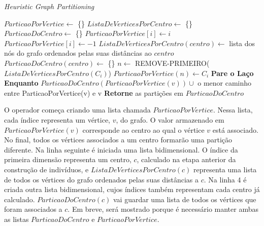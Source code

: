 \begin{algorithm}                  %
	\caption{\textit{Heuristic Graph Partitioning}}          %
	\label{partitioning_fungal}                           %
	\begin{algorithmic}[1]                    %
		\newline
		\State $ParticaoPorVertice \gets $ \{\}
		\State $ListaDeVerticesPorCentro \gets $ \{\}
		\State $ParticaoDoCentro \gets $ \{\}
				\State $ParticaoPorVertice[i] \gets i$
			\Else
				\State $ParticaoPorVertice[i] \gets -1$
			\EndIf
		\EndFor
			\State $ListaDeVerticesPorCentro(centro) \gets $ lista dos nós do grafo ordenados pelas suas distâncias ao $centro$
			\State $ParticaoDoCentro(centro) \gets $ \{\}
		\EndFor
		\Repeat
					\State $n \gets $ REMOVE-PRIMEIRO($ListaDeVerticesPorCentro(C_{i})$)
						\State $ParticaoPorVertice(n) \gets C_{i}$
						\State \textbf{Pare o Laço Enquanto}
					\EndIf
				\EndWhile
			\EndFor
		 
			\State $ParticaoDoCentro(ParticaoPorVertice(v)) \cup $ {o menor caminho entre ParticaoPorVertice(v) e v}
		\EndFor
		\State \textbf{Retorne} as partições em $ParticaoDoCentro$
		\EndProcedure
	\end{algorithmic}
\end{algorithm}

O operador começa criando uma lista chamada $ParticaoPorVertice$. Nessa lista, 
cada índice representa um vértice, $v$, do grafo. O valor armazenado em 
$ParticaoPorVertice(v)$ corresponde ao centro ao qual o vértice $v$ está 
associado. No final, todos os vértices associados a um centro formarão uma 
partição diferente. Na linha seguinte é iniciada uma lista bidimensional. O 
índice da primeira dimensão representa um centro, $c$, calculado na etapa 
anterior da construção de indivíduos, e $ListaDeVerticesPorCentro(c)$ representa 
uma lista de todos os vértices do grafo ordenados pelas suas distâncias a $c$. 
Na linha 4 é criada outra lista bidimensional, cujos índices também representam 
cada centro já calculado. $ParticaoDoCentro(c)$ vai guardar uma lista de todos 
os vértices que foram associados a $c$. Em breve, será mostrado porque é 
necessário manter ambas as listas $ParticaoDoCentro$ e $ParticaoPorVertice$.


